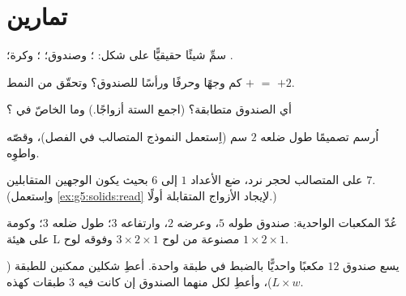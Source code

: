 \section{تمارين}

\begin{exercise}[$\star$]\label{exo:g5:solids:1}
سمِّ شيئًا حقيقيًّا على شكل: ؛ وصندوق؛ ؛ وكرة؛
.
\end{exercise}

\begin{exercise}[$\star$]\label{exo:g5:solids:2}
كم وجهًا وحرفًا ورأسًا للصندوق؟ وتحقّق من النمط
 $+$  $=$  $+ 2$.
\end{exercise}

\begin{exercise}[$\star$]\label{exo:g5:solids:3}
أي  الصندوق متطابقة؟ (اجمع  الستة أزواجًا.)
وما الخاصّ في  ؟
\end{exercise}

\begin{exercise}[$\star$]\label{exo:g5:solids:4}
اُرسم تصميمًا  طول ضلعه $2$ سم (اِستعمل النموذج المتصالب
في الفصل)، وقصّه واطوِه.
\end{exercise}

\begin{exercise}[$\star$]\label{exo:g5:solids:5}
على  المتصالب لحجر نرد، ضع الأعداد $1$ إلى $6$ بحيث
يكون  الوجهين المتقابلين $7$. (واِستعمل \cref{ex:g5:solids:read}
لإيجاد الأزواج المتقابلة أولًا.)
\end{exercise}

\begin{exercise}[$\star$]\label{exo:g5:solids:6}
عُدّ المكعبات الواحدية: صندوق طوله $5$، وعرضه $2$، وارتفاعه $3$؛
 طول ضلعه $3$؛ وكومة على هيئة L مصنوعة من لوح
$3 \times 2 \times 1$ وفوقه لوح $1 \times 2 \times 1$.
\end{exercise}

\begin{exercise}[$\star$]\label{exo:g5:solids:7}
يسع صندوق $12$ مكعبًا واحديًّا بالضبط في طبقة واحدة. أعطِ شكلين
ممكنين للطبقة ($L \times w$)، وأعطِ لكل منهما  الصندوق إن
كانت فيه $3$ طبقات كهذه.
\end{exercise}

